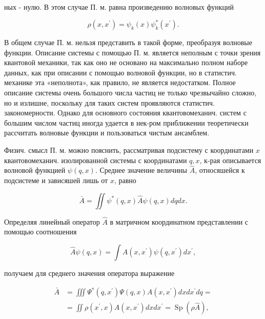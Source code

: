 \documentclass[10pt]{article}
\begin{document}
ных - нулю. В этом случае П. м. равна произведению волновых функций



\[

\rho\left(x, x^{\prime}\right)=\psi_{k}(x) \psi_{k}^{*}\left(x^{\prime}\right) .

\]



В общем случае П. м. нельзя представить в такой форме, преобразуя волновые функции. Описание системы с помощью П. м. является неполным с точки зрения квантовой механики, так как оно не основано на максимально полном наборе данных, как при описании с помощью волновой функции, но в статистич. механике эта «неполнота», как правило, не является недостатком. Полное описание системы очень большого числа частиц не только чрезвычайно сложно, но и излишне, поскольку для таких систем проявляются статистич. закономерности. Однако для основного состояния квантовомеханич. систем с большим числом частиц иногда удается в нек-ром приближении теоретически рассчитать волновые функции и пользоваться чистым ансамблем.



Физич. смысл П. м. можно пояснить, рассматривая подсистему с координатами $x$ квантовомеханич. изолированной системы с координатами $q, x$, к-рая описывается волновой функцией $\psi(q, x)$. Среднее значение величины $\hat{A}$, относяшейся к подсистеме и зависяшей лишь от $x$, равно



\[

\bar{A}=\iint \psi^{*}(q, x) \hat{A} \psi(q, x) d q d x .

\]



Определяя линейный оператор $\hat{A}$ в матричном координатном представлении с помощью соотношения



\[

\hat{A} \psi(q, x)=\int A\left(x, x^{\prime}\right) \psi\left(q, x^{\prime}\right) d x^{\prime},

\]



получаем для среднего значения оператора выражение



\[

\begin{aligned}

\bar{A} & =\iiint \Psi^{*}\left(q, x^{\prime}\right) \Psi(q, x) A\left(x, x^{\prime}\right) d x d x^{\prime} d q= \\

& =\iint \rho\left(x^{\prime}, x\right) A\left(x, x^{\prime}\right) d x d x^{\prime}=\operatorname{Sp}(\rho \hat{A}),

\end{aligned}

\]
\end{document}
